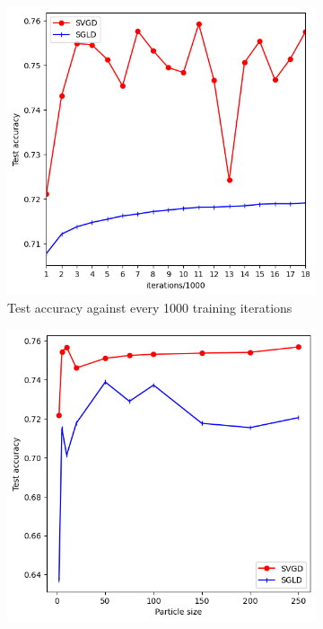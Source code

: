 \begin{figure}[ht]
	\centering
	\begin{subfigure}[b]{0.45\textwidth}
		\centering
		\includegraphics[height=0.2\textheight]{figs/sgvd_sgld_1.png}
		\caption{Test accuracy against every 1000 training iterations}
		\label{fig:acc_iter}
	\end{subfigure}
	\hfill
	\begin{subfigure}[b]{0.45\textwidth}
		\centering
		\includegraphics[height=0.2\textheight]{figs/sgvd_sgld_2.png}

\end{subfigure}
\end{figure}
